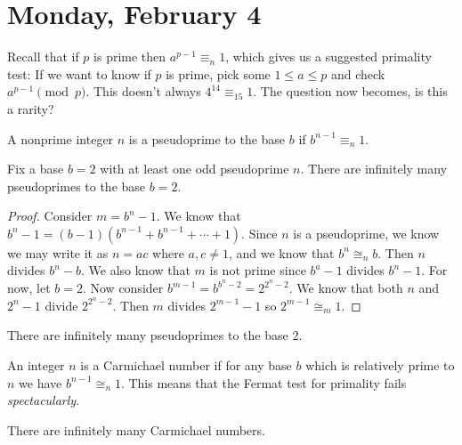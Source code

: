 
\section{Monday, February 4}

Recall that if $p$ is prime then $a^{p-1} \equiv_n 1$, which gives us a suggested primality test: If we want to know if $p$ is prime, pick some $1 \leq a \leq p$ and check $a^{p-1} \pmod{p}$. This doesn't always $4^{14} \equiv_{15} 1 $. The question now becomes, is this a rarity?

\begin{definition}[Pseudoprime]
A nonprime integer $n$ is a pseudoprime to the base $b$ if $b^{n-1} \equiv_n 1$.
\end{definition}

\begin{theorem}
Fix a base $b=2$ with at least one odd pseudoprime $n$. There are infinitely many pseudoprimes to the base $b=2$.
\end{theorem}

\begin{proof}
Consider $m = b^n - 1$. We know that $b^n - 1 = (b-1)(b^{n-1} + b^{n-1} + \cdots + 1)$. Since $n$ is a pseudoprime, we know we may write it as $n = ac$ where $a,c \not= 1$, and we know that $b^n \cong_n b$. Then $n$ divides $b^n - b$. We also know that $m$ is not prime since $b^a - 1$ divides $b^n - 1$.
For now, let $b=2$. Now consider $b^{m-1} = b^{b^n - 2} = 2^{2^n - 2}$. We know that both $n$ and $2^{n}-1$ divide $2^{2^n-2}$. Then $m$ divides $2^{m-1}-1$ so $2^{m-1} \cong_m 1$.
\end{proof}

\begin{corollary}
There are infinitely many pseudoprimes to the base $2$.
\end{corollary}

\begin{definition}
An integer $n$ is a Carmichael number if for any base $b$ which is relatively prime to $n$ we have $b^{n-1} \cong_n 1$. This means that the Fermat test for primality fails \emph{spectacularly}.
\end{definition}

\begin{theorem}
There are infinitely many Carmichael numbers.
\end{theorem}

